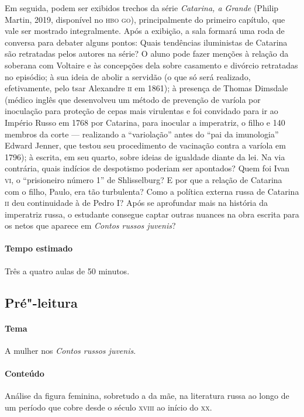 \documentclass[11pt]{extarticle}
\begin{document}
Em seguida, podem ser exibidos trechos da série \emph{Catarina, a
Grande} (Philip Martin, 2019, disponível no \textsc{hbo go}), principalmente do
primeiro capítulo, que vale ser mostrado integralmente. Após a exibição,
a sala formará uma roda de conversa para debater alguns pontos: Quais
tendências iluministas de Catarina são retratadas pelos autores na
série? O aluno pode fazer menções à relação da soberana com Voltaire e
às concepções dela sobre casamento e divórcio retratadas no episódio; à
sua ideia de abolir a servidão (o que só será realizado, efetivamente,
pelo tsar Alexandre \textsc{ii} em 1861); à presença de Thomas Dimsdale (médico
inglês que desenvolveu um método de prevenção de varíola por inoculação
para proteção de cepas mais virulentas e foi convidado para ir ao
Império Russo em 1768 por Catarina, para inocular a imperatriz, o filho
e 140 membros da corte --- realizando a ``variolação'' antes do ``pai da
imunologia'' Edward Jenner, que testou seu procedimento de vacinação
contra a varíola em 1796); à escrita, em seu quarto, sobre ideias de
igualdade diante da lei. Na via contrária, quais indícios de despotismo
poderiam ser apontados? Quem foi Ivan \textsc{vi}, o ``prisioneiro número 1'' de
Shlisselburg? E por que a relação de Catarina com o filho, Paulo, era
tão turbulenta? Como a política externa russa de Catarina \textsc{ii} deu
continuidade à de Pedro I? Após se aprofundar mais na história da
imperatriz russa, o estudante consegue captar outras nuances na obra
escrita para os netos que aparece em \emph{Contos russos juvenis}?

\paragraph{Tempo estimado} Três a quatro aulas de 50 minutos.

\subsection{Pré"-leitura}

\paragraph{Tema} A mulher nos \emph{Contos russos juvenis}.


\paragraph{Conteúdo}
Análise da figura feminina, sobretudo a da mãe, na literatura russa ao
longo de um período que cobre desde o século \textsc{xviii} ao início do \textsc{xx}.
\end{document}
